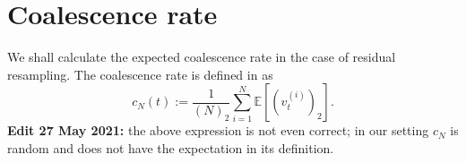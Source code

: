 \documentclass[fleqn]{article}
\newcommand{\E}{\mathbb{E}}
\newcommand{\vt}[2][t]{v_{#1}^{(#2)}}
\begin{document}
%
%
%

\section{Coalescence rate}
We shall calculate the expected coalescence rate in the case of residual resampling. The coalescence rate is defined in \citet{koskela2018} as
\begin{equation*}
c_N(t) := \frac{1}{(N)_2} \sum_{i=1}^{N} \E\left[ (\vt{i})_2 \right].
\end{equation*}
\textbf{Edit 27 May 2021:} the above expression is not even correct; in our setting $c_N$ is random and does not have the expectation in its definition.\\
\end{document}
